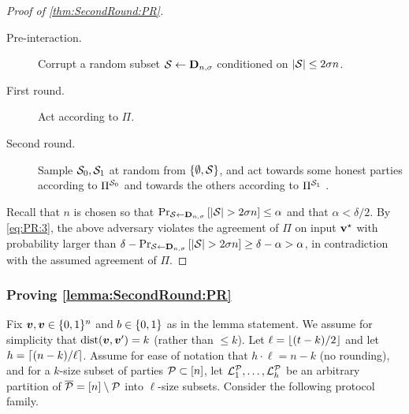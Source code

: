 \begin{proof}[Proof of \cref{thm:SecondRound:PR}]
{\begin{algorithm}[$\Ac$]
		\begin{description}
			\item[Pre-interaction.]
			Corrupt a random subset $\mathcal{S} \gets \mathbf{D}_{n,\sigma} $ conditioned on $\left|{\cal{S}}\right| \le 2\sigma n$.
			
			\item[First round.] Act according to $\Pi$.
			\item[Second round.] Sample ${\cal{S}}_0,{\cal{S}}_1$ at random from $\left\{\emptyset,{\cal{S}}\right\}$, and act towards some honest parties according to $\Pi^{{\cal{S}}_0}$ and towards the others according to $\Pi^{{\cal{S}}_1}$ .
		\end{description}
	\end{algorithm}
}
Recall that $n$ is chosen so that $\Pr_{{\cal{S}} \gets \mathbf{D}_{n,\sigma}}\left[\left|{\cal{S}}\right| >2\sigma n\right] \leq \alpha$ and that $\alpha < \delta/2$.
By \cref{eq:PR:3}, the above adversary violates the agreement of $\Pi$ on input $\mathbf{v}^{\star}$ with probability larger than $\delta - \Pr_{{\cal{S}} \gets \mathbf{D}_{n,\sigma}}\left[\left|{\cal{S}}\right| >2\sigma n\right] \ge \delta - \alpha >\alpha$, in contradiction with the assumed agreement of $\Pi$.
\end{proof}


\newcommand{\VV}{\cV^{\cP}}
\renewcommand{\PP}{\Pi^{\cP,\cS}}
\newcommand{\ops}{{\overline{\cP \cup \cS}}}

\subsubsection{Proving \cref{lemma:SecondRound:PR}}\label{sec:lemma:SecondRound:PR}
Fix ${ \boldsymbol{v}},{ \boldsymbol{v}} \in {\{0,1\}^n}$ and $b\in \{0,1\}$ as in the lemma statement. We assume for simplicity that $\mathrm{dist}({ \boldsymbol{v}},{ \boldsymbol{v}}')=k$ (rather than $\le k$).
Let $\ell= \left \lfloor(t -k)/2 \right \rfloor$ and let $h = \left\lceil (n-k)/\ell \right\rceil$. Assume for ease of notation that $h\cdot \ell = n-k $ (\ie no rounding), and for a $k$-size subset of parties $\mathcal{P} \subset [n]$, let $ {\cal{L}}^{\mathcal{P}}_1,\dots,{\cal{L}}_h^{\mathcal{P}}$ be an arbitrary partition of ${\overline{\mathcal{P}}} = [n] \setminus \mathcal{P}$ into $\ell$-size subsets. Consider the following protocol family.


